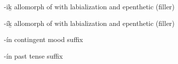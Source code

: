 \begin{morphdesc}[resume*=alphalist]
\item[-iḵ]\label{m:-iḵ}
	allomorph of  with labialization and epenthetic (filler) 

\item[-íḵ]\label{m:-íḵ}
	allomorph of  with labialization and epenthetic (filler) 

\item[-ín]\label{m:-ín-ctng}
	contingent mood suffix

\item[-ín]\label{m:-ín-past}
	past tense suffix
\end{morphdesc}
